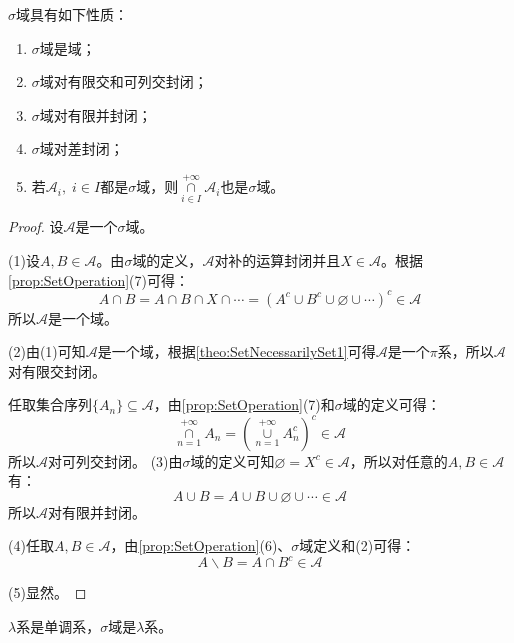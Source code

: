 \begin{property}\label{prop:SigmaField}
	$\sigma$域具有如下性质：
	\begin{enumerate}
		\item $\sigma$域是域；
		\item $\sigma$域对有限交和可列交封闭；
		\item $\sigma$域对有限并封闭；
		\item $\sigma$域对差封闭；
		\item 若$\mathscr{A}_i,\;i\in I$都是$\sigma$域，则$\underset{i\in I}{\overset{+\infty}{\cap}}\mathscr{A}_i$也是$\sigma$域。
	\end{enumerate}
\end{property}
\begin{proof}
	设$\mathscr{A}$是一个$\sigma$域。\par
	(1)设$A,B\in\mathscr{A}$。由$\sigma$域的定义，$\mathscr{A}$对补的运算封闭并且$X\in\mathscr{A}$。根据\cref{prop:SetOperation}(7)可得：
	\begin{equation*}
		A\cap B=A\cap B\cap X\cap\cdots=(A^c\cup B^c\cup\varnothing\cup\cdots)^c\in\mathscr{A}
	\end{equation*}
	所以$\mathscr{A}$是一个域。\par
	(2)由(1)可知$\mathscr{A}$是一个域，根据\cref{theo:SetNecessarilySet1}可得$\mathscr{A}$是一个$\pi$系，所以$\mathscr{A}$对有限交封闭。\par
	任取集合序列$\{A_n\}\subseteq\mathscr{A}$，由\cref{prop:SetOperation}(7)和$\sigma$域的定义可得：
	\begin{equation*}
		\underset{n=1}{\overset{+\infty}{\cap}}A_n=\left(\underset{n=1}{\overset{+\infty}{\cup}}A_n^c\right)^c\in\mathscr{A}
	\end{equation*}
	所以$\mathscr{A}$对可列交封闭。
	(3)由$\sigma$域的定义可知$\varnothing=X^c\in\mathscr{A}$，所以对任意的$A,B\in\mathscr{A}$有：
	\begin{equation*}
		A\cup B=A\cup B\cup\varnothing\cup\cdots\in\mathscr{A}
	\end{equation*}
	所以$\mathscr{A}$对有限并封闭。\par
	(4)任取$A,B\in\mathscr{A}$，由\cref{prop:SetOperation}(6)、$\sigma$域定义和(2)可得：
	\begin{equation*}
		A\backslash B=A\cap B^c\in\mathscr{A}
	\end{equation*}\par
	(5)显然。
\end{proof}
\begin{theorem}\label{theo:SetNecessarilySet2}
	$\lambda$系是单调系，$\sigma$域是$\lambda$系。
\end{theorem}
